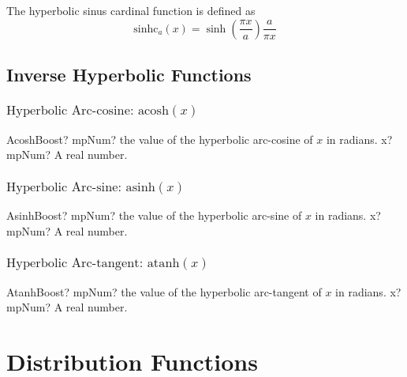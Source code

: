 \vspace{0.3cm}
The hyperbolic sinus cardinal function is defined as
\begin{equation}
	\text{sinhc}_a(x) = \sinh \left( \frac{\pi x}{a} \right) \frac{a}{\pi x}
\end{equation}




\section{Inverse Hyperbolic Functions}


\subsection{\texorpdfstring{$\text{Hyperbolic Arc-cosine: acosh}(x)$}{acosh}}

\begin{mpFunctionsExtract}
	\mpFunctionOne
	{AcoshBoost? mpNum? the value of the hyperbolic arc-cosine  of $x$ in radians.}
	{x? mpNum? A real number.}
\end{mpFunctionsExtract}




\subsection{\texorpdfstring{$\text{Hyperbolic Arc-sine: asinh}(x)$}{asinh}}

\begin{mpFunctionsExtract}
	\mpFunctionOne
	{AsinhBoost? mpNum? the value of the hyperbolic arc-sine  of $x$ in radians.}
	{x? mpNum? A real number.}
\end{mpFunctionsExtract}



\subsection{\texorpdfstring{$\text{Hyperbolic Arc-tangent: atanh}(x)$}{atanh}}

\begin{mpFunctionsExtract}
	\mpFunctionOne
	{AtanhBoost? mpNum? the value of the hyperbolic arc-tangent  of $x$ in radians.}
	{x? mpNum? A real number.}
\end{mpFunctionsExtract}







\chapter{Distribution Functions}

